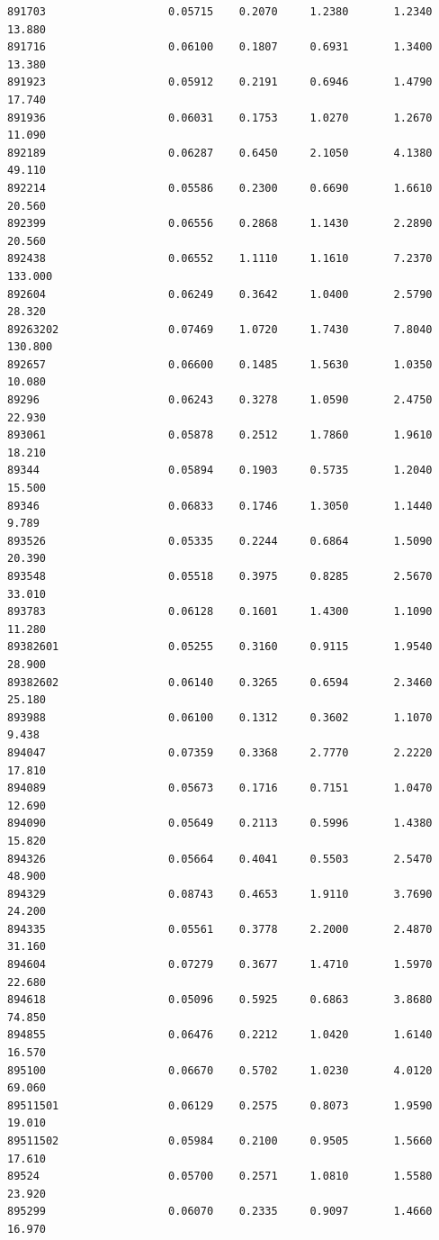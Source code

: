 \documentclass[
  letterpaper,
  DIV=11,
  numbers=noendperiod]{scrartcl}
\begin{document}
\begin{verbatim}
891703                   0.05715    0.2070     1.2380       1.2340  13.880
891716                   0.06100    0.1807     0.6931       1.3400  13.380
891923                   0.05912    0.2191     0.6946       1.4790  17.740
891936                   0.06031    0.1753     1.0270       1.2670  11.090
892189                   0.06287    0.6450     2.1050       4.1380  49.110
892214                   0.05586    0.2300     0.6690       1.6610  20.560
892399                   0.06556    0.2868     1.1430       2.2890  20.560
892438                   0.06552    1.1110     1.1610       7.2370 133.000
892604                   0.06249    0.3642     1.0400       2.5790  28.320
89263202                 0.07469    1.0720     1.7430       7.8040 130.800
892657                   0.06600    0.1485     1.5630       1.0350  10.080
89296                    0.06243    0.3278     1.0590       2.4750  22.930
893061                   0.05878    0.2512     1.7860       1.9610  18.210
89344                    0.05894    0.1903     0.5735       1.2040  15.500
89346                    0.06833    0.1746     1.3050       1.1440   9.789
893526                   0.05335    0.2244     0.6864       1.5090  20.390
893548                   0.05518    0.3975     0.8285       2.5670  33.010
893783                   0.06128    0.1601     1.4300       1.1090  11.280
89382601                 0.05255    0.3160     0.9115       1.9540  28.900
89382602                 0.06140    0.3265     0.6594       2.3460  25.180
893988                   0.06100    0.1312     0.3602       1.1070   9.438
894047                   0.07359    0.3368     2.7770       2.2220  17.810
894089                   0.05673    0.1716     0.7151       1.0470  12.690
894090                   0.05649    0.2113     0.5996       1.4380  15.820
894326                   0.05664    0.4041     0.5503       2.5470  48.900
894329                   0.08743    0.4653     1.9110       3.7690  24.200
894335                   0.05561    0.3778     2.2000       2.4870  31.160
894604                   0.07279    0.3677     1.4710       1.5970  22.680
894618                   0.05096    0.5925     0.6863       3.8680  74.850
894855                   0.06476    0.2212     1.0420       1.6140  16.570
895100                   0.06670    0.5702     1.0230       4.0120  69.060
89511501                 0.06129    0.2575     0.8073       1.9590  19.010
89511502                 0.05984    0.2100     0.9505       1.5660  17.610
89524                    0.05700    0.2571     1.0810       1.5580  23.920
895299                   0.06070    0.2335     0.9097       1.4660  16.970

\end{verbatim}
\end{document}
